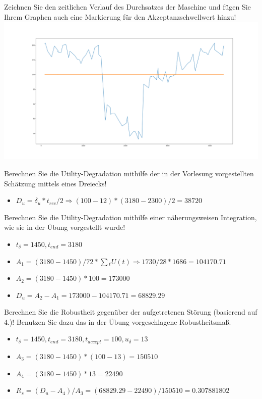 \documentclass{ocbeameruni}
\begin{document}
\begin{frame}{3.2}
    \begin{center}
Zeichnen Sie den zeitlichen Verlauf des Durchsatzes der Maschine und fügen Sie Ihrem Graphen
auch eine Markierung für den Akzeptanzschwellwert hinzu!
    \includegraphics[scale=0.16]{oc_3-2.png}
    \end{center}
\end{frame}

\begin{frame}{3.3}
Berechnen Sie die Utility-Degradation mithilfe der in der Vorlesung vorgestellten Schätzung
mittels eines Dreiecks!
    \begin{itemize}
    \item $D_u = \delta{_u} * t_{rec} / 2 \Rightarrow (100-12) * (3180-2300) / 2 = 38720$
    \end{itemize}
\end{frame}

\begin{frame}{3.4}
Berechnen Sie die Utility-Degradation mithilfe einer näherungsweisen Integration, wie sie in
der Übung vorgestellt wurde!
    \begin{itemize}
    \item $t_{\delta} = 1450, t_{end} = 3180$
    \item $A_1 = (3180-1450)/72 * \sum{_t} U(t) \Rightarrow 1730/28 * 1686 = 104170.71$
    \item $A_2 = (3180-1450)*100 = 173000$
    \item $D_u = A_2 - A_1 = 173000 - 104170.71 = 68829.29$
    \end{itemize}
\end{frame}

\begin{frame}{3.5}
Berechnen Sie die Robustheit gegenüber der aufgetretenen Störung (basierend auf 4.)! Benutzen
Sie dazu das in der Übung vorgeschlagene Robustheitsmaß.
    \begin{itemize}
    \item $t_{\delta} = 1450, t_{end} = 3180, t_{accept} = 100, u_{\delta} = 13$
    \item $A_3 = (3180-1450) * (100-13) = 150510$
    \item $A_4 = (3180-1450) * 13 = 22490$
    \item $R_s = (D_u - A_4) / A_3 = (68829.29 - 22490) / 150510 = 0.307881802$
    \end{itemize}
\end{frame}
\end{document}
